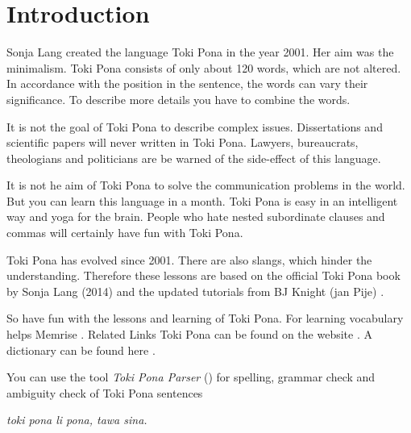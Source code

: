 \section{Introduction}
%
Sonja Lang created the language Toki Pona in the year 2001. 
Her aim was the minimalism. 
Toki Pona consists of only about 120 words, which are not altered. 
In accordance with the position in the sentence, the words can vary their significance. 
To describe more details you have to combine the words.

It is not the goal of Toki Pona to describe complex issues. 
Dissertations and scientific papers will never written in Toki Pona. 
Lawyers, bureaucrats, theologians and politicians are be warned of the side-effect of this language.

It is not he aim of Toki Pona to solve the communication problems in the world. 
But you can learn this language in a month. 
Toki Pona is easy in an intelligent way and yoga for the brain. 
People who hate nested subordinate clauses and commas will certainly have fun with Toki Pona.

Toki Pona has evolved since 2001. 
There are also slangs, which hinder the understanding. 
Therefore these lessons are based on the official Toki Pona book \cite{www:tokipona.org} by Sonja Lang (2014) and the updated tutorials from BJ Knight (jan Pije) \cite{www:Pije:01}.

So have fun with the lessons and learning of Toki Pona. 
For learning vocabulary helps Memrise \cite{www:memrise:01}. Related Links Toki Pona can be found on the website \cite{www:rowa:01}. 
A dictionary can be found here \cite{www:rowa:01}. 

You can use the tool \textit{Toki Pona Parser} (\cite{www:rowa:02}) for spelling, grammar check and ambiguity check of Toki Pona sentences 



\textit{toki pona li pona, tawa sina.}
%
